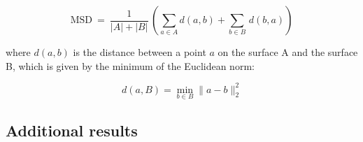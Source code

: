 \documentclass[journal]{IEEEtran}
\begin{document}
\begin{equation}
\mathrm{MSD} \ = \ \dfrac{1}{|A| + |B|} \, \left(\sum_{a \in A} d(a,b) + \sum_{b \in B}  \, d(b,a) \right)
\end{equation}

where $d(a,b)$ is the distance between a point $a$ on the surface A and the surface B, which is given by the minimum of the Euclidean norm:

\begin{equation}
    d(a,B) = \min_{b \in B} \| a - b\|^2_2
\end{equation}



\subsection*{\textbf{Additional results}}
\end{document}
